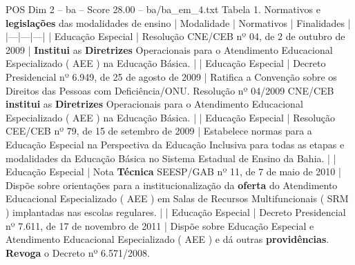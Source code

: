\begin{textsample}{POS Dim 2 – ba – Score 28.00 – ba/ba\_em\_4.txt}  \label{ex:f2_pos_036}
Tabela 1.
Normativos e \textbf{legislações} das modalidades de ensino | Modalidade | Normativos | Finalidades | |---|---|---| | Educação Especial | Resolução CNE/CEB nº 04, de 2 de outubro de 2009 | \textbf{Institui} as \textbf{Diretrizes} Operacionais para o Atendimento Educacional Especializado ( AEE ) na Educação Básica. | | Educação Especial | Decreto Presidencial nº 6.949, de 25 de agosto de 2009 | Ratifica a Convenção sobre os Direitos das Pessoas com Deficiência/ONU.
Resolução nº 04/2009 CNE/CEB \textbf{institui} as \textbf{Diretrizes} Operacionais para o Atendimento Educacional Especializado ( AEE ) na Educação Básica. | | Educação Especial | Resolução CEE/CEB nº 79, de 15 de setembro de 2009 | Estabelece normas para a Educação Especial na Perspectiva da Educação Inclusiva para todas as etapas e modalidades da Educação Básica no Sistema Estadual de Ensino da Bahia. | | Educação Especial | Nota \textbf{Técnica} SEESP/GAB nº 11, de 7 de maio de 2010 | Dispõe sobre orientações para a institucionalização da \textbf{oferta} do Atendimento Educacional Especializado ( AEE ) em Salas de Recursos Multifuncionais ( SRM ) implantadas nas escolas regulares. | | Educação Especial | Decreto Presidencial nº 7.611, de 17 de novembro de 2011 | Dispõe sobre Educação Especial e Atendimento Educacional Especializado ( AEE ) e dá outras \textbf{providências}. \textbf{Revoga} o Decreto nº 6.571/2008.

\end{textsample}
